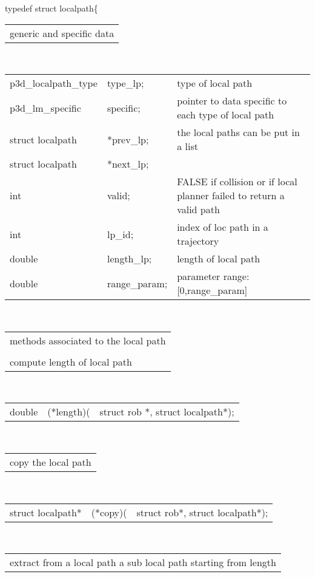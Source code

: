 \begin{itemize}
typedef struct localpath\{\\
\begin{tabular}{l}\\
  generic and specific data \\
\end{tabular}\\
\begin{tabular}{l l l}
  p3d\_localpath\_type &    type\_lp; &  type of local path \\
  p3d\_lm\_specific &specific; & pointer to data specific to each type
  of local path \\
  struct localpath &*prev\_lp; &  the local paths can be put in a list\\
  struct localpath &*next\_lp; &\\
  int  & valid; &            FALSE if collision or if local planner
  failed to return a valid path \\
  int  & lp\_id;&             index of loc path in a trajectory \\ 
  double &  length\_lp;&       length of local path \\
  double & range\_param;&      parameter range: [0,range\_param] \\
\end{tabular}\\
\begin{tabular}{l}\\
   methods associated to the local path \\
\\
  compute length of local path 
\end{tabular}\\
\begin{tabular}{l l l}
  double & (*length)(& struct rob *, struct localpath*); \\
\end{tabular}\\
\begin{tabular}{l}\\
  copy the local path 
\end{tabular}\\
\begin{tabular}{l l l}
  struct localpath* &(*copy)(&struct rob*, struct localpath*); \\
\end{tabular}\\
\begin{tabular}{l}\\
  extract from a local path a sub local path starting from length

\end{tabular}
\end{itemize}
